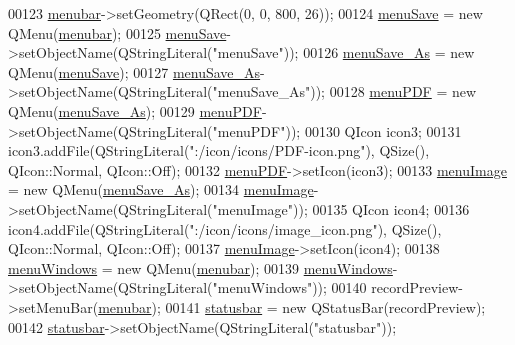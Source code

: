 \begin{DoxyCode}
00123         \hyperlink{a00028_adddc4285028693f10dfd49cd08276e83}{menubar}->setGeometry(QRect(0, 0, 800, 26));
00124         \hyperlink{a00028_a5ef77bf8c78c201d83049ee8b40cf345}{menuSave} = \textcolor{keyword}{new} QMenu(\hyperlink{a00028_adddc4285028693f10dfd49cd08276e83}{menubar});
00125         \hyperlink{a00028_a5ef77bf8c78c201d83049ee8b40cf345}{menuSave}->setObjectName(QStringLiteral(\textcolor{stringliteral}{"menuSave"}));
00126         \hyperlink{a00028_aaf69c873ec3bf0ea397829122ca4a224}{menuSave\_As} = \textcolor{keyword}{new} QMenu(\hyperlink{a00028_a5ef77bf8c78c201d83049ee8b40cf345}{menuSave});
00127         \hyperlink{a00028_aaf69c873ec3bf0ea397829122ca4a224}{menuSave\_As}->setObjectName(QStringLiteral(\textcolor{stringliteral}{"menuSave\_As"}));
00128         \hyperlink{a00028_a4cdb6b113583d4ef43a08b5526c13e3a}{menuPDF} = \textcolor{keyword}{new} QMenu(\hyperlink{a00028_aaf69c873ec3bf0ea397829122ca4a224}{menuSave\_As});
00129         \hyperlink{a00028_a4cdb6b113583d4ef43a08b5526c13e3a}{menuPDF}->setObjectName(QStringLiteral(\textcolor{stringliteral}{"menuPDF"}));
00130         QIcon icon3;
00131         icon3.addFile(QStringLiteral(\textcolor{stringliteral}{":/icon/icons/PDF-icon.png"}), QSize(), QIcon::Normal, QIcon::Off);
00132         \hyperlink{a00028_a4cdb6b113583d4ef43a08b5526c13e3a}{menuPDF}->setIcon(icon3);
00133         \hyperlink{a00028_af1ff1ecbe6ea007cfeda320cca9865b7}{menuImage} = \textcolor{keyword}{new} QMenu(\hyperlink{a00028_aaf69c873ec3bf0ea397829122ca4a224}{menuSave\_As});
00134         \hyperlink{a00028_af1ff1ecbe6ea007cfeda320cca9865b7}{menuImage}->setObjectName(QStringLiteral(\textcolor{stringliteral}{"menuImage"}));
00135         QIcon icon4;
00136         icon4.addFile(QStringLiteral(\textcolor{stringliteral}{":/icon/icons/image\_icon.png"}), QSize(), QIcon::Normal, QIcon::Off);
00137         \hyperlink{a00028_af1ff1ecbe6ea007cfeda320cca9865b7}{menuImage}->setIcon(icon4);
00138         \hyperlink{a00028_afd93511da273fc2c6a88472d154cb176}{menuWindows} = \textcolor{keyword}{new} QMenu(\hyperlink{a00028_adddc4285028693f10dfd49cd08276e83}{menubar});
00139         \hyperlink{a00028_afd93511da273fc2c6a88472d154cb176}{menuWindows}->setObjectName(QStringLiteral(\textcolor{stringliteral}{"menuWindows"}));
00140         recordPreview->setMenuBar(\hyperlink{a00028_adddc4285028693f10dfd49cd08276e83}{menubar});
00141         \hyperlink{a00028_a5573ce6bc38b919d995ee7927b66c223}{statusbar} = \textcolor{keyword}{new} QStatusBar(recordPreview);
00142         \hyperlink{a00028_a5573ce6bc38b919d995ee7927b66c223}{statusbar}->setObjectName(QStringLiteral(\textcolor{stringliteral}{"statusbar"}));

\end{DoxyCode}
